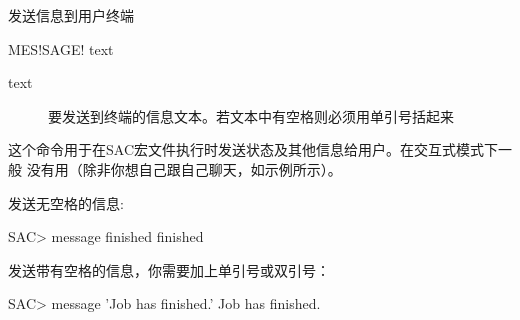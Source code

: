 \label{cmd:message}

发送信息到用户终端

\begin{SACSTX}
MES!SAGE! text
\end{SACSTX}

\begin{description}
\item [text] 要发送到终端的信息文本。若文本中有空格则必须用单引号括起来
\end{description}

这个命令用于在SAC宏文件执行时发送状态及其他信息给用户。在交互式模式下一般
没有用（除非你想自己跟自己聊天，如示例所示）。

发送无空格的信息:
\begin{SACCode}
SAC> message finished
 finished
\end{SACCode}

发送带有空格的信息，你需要加上单引号或双引号：
\begin{SACCode}
SAC> message 'Job has finished.'
 Job has finished.
\end{SACCode}
